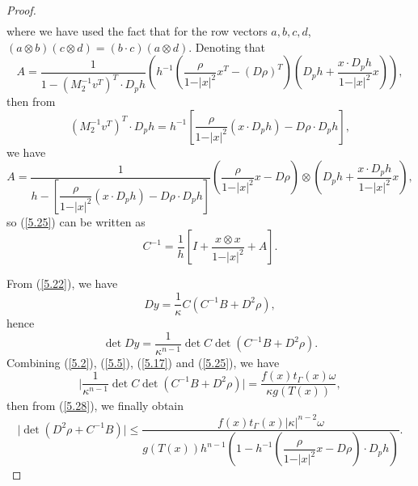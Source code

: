 \documentclass[10pt,a4paper]{amsart}
\begin{document}
\begin{proof}
\begin{align*}
  \end{align*}
  where we have used the fact that for the row vectors $a,b,c,d$, $(a \otimes b)(c \otimes d) = (b \cdot c)(a \otimes d)$. Denoting that
  \begin{equation*}
    A = \frac{1}{1 - (M_{2}^{-1}v^{T})^{T}\cdot D_{p}h}\left(h^{-1}\left(\frac{\rho}{1 - \vert x \vert^{2}}x^{T} - (D\rho)^{T}\right)\left(D_{p}h + \frac{x \cdot D_{p}h}{1 - \vert x \vert^{2}}x\right)\right),
  \end{equation*}
  then from
  \begin{equation*}
    (M_{2}^{-1}v^{T})^{T}\cdot D_{p}h = h^{-1}\left[\frac{\rho}{1 - \vert x \vert^{2}}(x \cdot D_{p}h) - D\rho \cdot D_{p}h\right],
  \end{equation*}
  we have
  \begin{equation*}
    A = \frac{1}{h - \left[\dfrac{\rho}{1 - \vert x \vert^{2}}(x \cdot D_{p}h) - D\rho \cdot D_{p}h\right]}\left(\frac{\rho}{1 - \vert x \vert^{2}}x - D\rho\right)\otimes \left(D_{p}h + \frac{x \cdot D_{p}h}{1 - \vert x \vert^{2}}x\right),
  \end{equation*}
  so (\ref{5.25}) can be written as
  \begin{equation*}
    C^{-1} = \frac{1}{h}\left[I + \frac{x \otimes x}{1 - \vert x \vert^{2}} + A\right].
  \end{equation*}

  From (\ref{5.22}), we have
  \begin{equation*}
    Dy = \frac{1}{\kappa}C(C^{-1}B + D^{2}\rho),
  \end{equation*}
  hence
  \begin{equation}\label{5.29}
    \det Dy = \frac{1}{\kappa^{n-1}} \det C \det (C^{-1}B + D^{2}\rho).
  \end{equation}
  Combining (\ref{5.2}), (\ref{5.5}), (\ref{5.17}) and (\ref{5.25}), we have
  \begin{equation*}
    \vert \frac{1}{\kappa^{n-1}} \det C \det (C^{-1}B + D^{2}\rho) \vert = \frac{f(x)t_{\Gamma}(x)\omega}{\kappa g(T(x))},
  \end{equation*}
  then from (\ref{5.28}), we finally obtain
  \begin{equation*}
    \vert \det (D^{2}\rho + C^{-1}B) \vert \leq \frac{f(x)t_{\Gamma}(x)\vert \kappa \vert^{n - 2} \omega}{g(T(x))h^{n - 1}\left(1 - h^{-1}\left(\dfrac{\rho}{1 - \vert x \vert^{2}}x - D\rho\right)\cdot D_{p}h\right)}.
  \end{equation*}

\end{proof}
\end{document}
